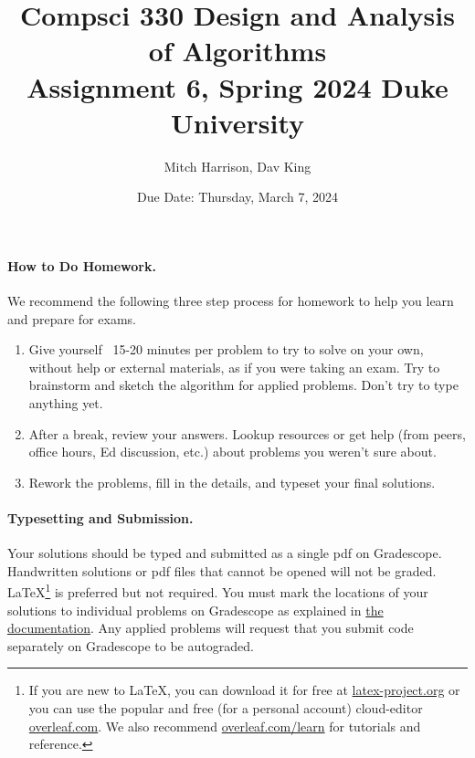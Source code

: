\documentclass[11pt]{article}
\title{\vspace{-0.5in}Compsci 330 Design and Analysis of Algorithms \\Assignment 6, Spring 2024 Duke University}
\author{Mitch Harrison, Dav King}
\date{Due Date: Thursday, March 7, 2024}
\begin{document}
\maketitle



\paragraph{How to Do Homework.} We recommend the following three step process for homework to help you learn and prepare for exams.
\begin{enumerate}
	\item Give yourself ~15-20 minutes per problem to try to solve on your own, without help or external materials, as if you were taking an exam. Try to brainstorm and sketch the algorithm for applied problems. Don't try to type anything yet.
	\item After a break, review your answers. Lookup resources or get help (from peers, office hours, Ed discussion, etc.) about problems you weren't sure about.
	\item Rework the problems, fill in the details, and typeset your final solutions.
\end{enumerate}

\paragraph{Typesetting and Submission.} Your solutions should be typed and submitted as a single pdf on Gradescope. Handwritten solutions or pdf files that cannot be opened will not be graded. \LaTeX \footnote{If you are new to \LaTeX, you can download it for free at \href{https://www.latex-project.org}{latex-project.org} or you can use the popular and free (for a personal account) cloud-editor \href{https://www.overleaf.com}{overleaf.com}. We also recommend \href{https://www.overleaf.com/learn}{overleaf.com/learn} for tutorials and reference.} is preferred but not required. %
You must mark the locations of your solutions to individual problems on Gradescope as explained in \href{https://help.gradescope.com/article/ccbpppziu9-student-submit-work#submitting_a_pdf}{the documentation}. Any applied problems will request that you submit code separately on Gradescope to be autograded. 
\end{document}
